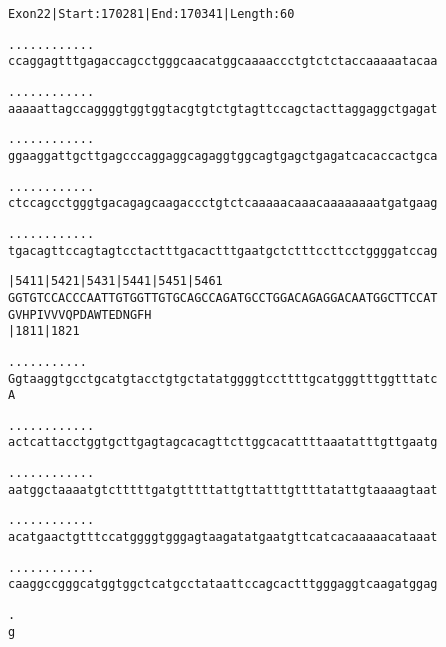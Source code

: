 \documentclass{article}
\begin{document}
\begin{alltt}
Exon 22 | Start: 170281 | End: 170341 | Length: 60

.    .    .    .    .    .    .    .    .    .    .    .    
ccaggagtttgagaccagcctgggcaacatggcaaaaccctgtctctaccaaaaatacaa

.    .    .    .    .    .    .    .    .    .    .    .    
aaaaattagccaggggtggtggtacgtgtctgtagttccagctacttaggaggctgagat

.    .    .    .    .    .    .    .    .    .    .    .    
ggaaggattgcttgagcccaggaggcagaggtggcagtgagctgagatcacaccactgca

.    .    .    .    .    .    .    .    .    .    .    .    
ctccagcctgggtgacagagcaagaccctgtctcaaaaacaaacaaaaaaaatgatgaag

.    .    .    .    .    .    .    .    .    .    .    .    
tgacagttccagtagtcctactttgacactttgaatgctctttccttcctggggatccag

    |5411     |5421     |5431     |5441     |5451     |5461 
GGTGTCCACCCAATTGTGGTTGTGCAGCCAGATGCCTGGACAGAGGACAATGGCTTCCAT
G  V  H  P  I  V  V  V  Q  P  D  A  W  T  E  D  N  G  F  H  
                        |1811                         |1821 

     .    .    .    .    .    .    .    .    .    .    .    
Ggtaaggtgcctgcatgtacctgtgctatatggggtccttttgcatgggtttggtttatc
A                                                           

.    .    .    .    .    .    .    .    .    .    .    .    
actcattacctggtgcttgagtagcacagttcttggcacattttaaatatttgttgaatg

.    .    .    .    .    .    .    .    .    .    .    .    
aatggctaaaatgtctttttgatgtttttattgttatttgttttatattgtaaaagtaat

.    .    .    .    .    .    .    .    .    .    .    .    
acatgaactgtttccatggggtgggagtaagatatgaatgttcatcacaaaaacataaat

.    .    .    .    .    .    .    .    .    .    .    .    
caaggccgggcatggtggctcatgcctataattccagcactttgggaggtcaagatggag

.
g
\end{alltt}
\newpage
\end{document}
